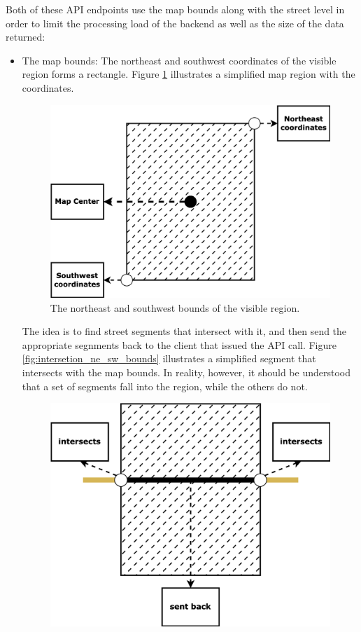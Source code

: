 Both of these API endpoints use the map bounds along with the street level in order to limit the processing load of the backend as well as the size of the data returned:
\begin{itemize}
    \item The map bounds: The northeast and southwest coordinates of the visible region forms a rectangle. Figure \ref{fig:ne_sw_bounds} illustrates a simplified map region with the coordinates.
    \begin{figure}[H]
        \centering
        \includegraphics[width=0.7\linewidth]{assets/images/Research/API/ne_sw_bounds.png}
        \caption{The northeast and southwest bounds of the visible region.}
        \label{fig:ne_sw_bounds}
    \end{figure}
    The idea is to find street segments that intersect with it, and then send the appropriate segnments back to the client that issued the API call. Figure \ref{fig:intersetion_ne_sw_bounds} illustrates a simplified segment that intersects with the map bounds. In reality, however, it should be understood that a set of segments fall into the region, while the others do not.
    \begin{figure}[H]
        \centering
        \includegraphics[width=\linewidth]{assets/images/Research/API/inaction_ne_sw--bounds.png}

\end{figure}
\end{itemize}
